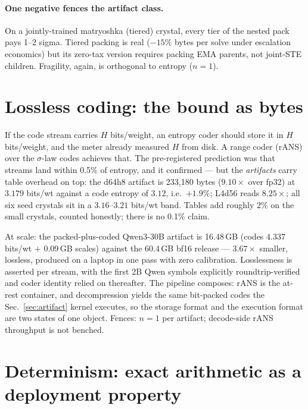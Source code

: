 \documentclass[11pt]{article}
\begin{document}
\paragraph{One negative fences the artifact class.}
On a jointly-trained matryoshka (tiered) crystal, every tier of the nested pack
pays 1--2 sigma. Tiered packing is real ($-15\%$ bytes per solve under escalation
economics) but its zero-tax version requires packing EMA parents, not joint-STE
children. Fragility, again, is orthogonal to entropy ($n{=}1$).

\section{Lossless coding: the bound as bytes}
\label{sec:rans}

If the code stream carries $H$ bits/weight, an entropy coder should store it in
$H$ bits/weight, and the meter already measured $H$ from disk. A range coder
(rANS) over the $\sigma$-law codes achieves that. The pre-registered prediction
was that streams land within 0.5\% of entropy, and it confirmed --- but the
\emph{artifacts} carry table overhead on top: the d64h8 artifact is 233{,}180
bytes ($9.10\times$ over fp32) at $3.179$ bits/wt against a code entropy of
$3.12$, i.e.\ $+1.9\%$; L4d56 reads $8.25\times$; all six seed crystals sit in a
$3.16$--$3.21$ bits/wt band. %
Tables add roughly 2\% on the small crystals, counted honestly; there is no
0.1\% claim.

At scale: the packed-plus-coded Qwen3-30B artifact is 16.48\,GB (codes $4.337$
bits/wt $+$ 0.09\,GB scales) against the 60.4\,GB bf16 release --- $3.67\times$
smaller, lossless, produced on a laptop in one pass with zero calibration.
Losslessness is asserted per stream, with the first 2B Qwen symbols explicitly
roundtrip-verified and coder identity relied on thereafter. %
The pipeline composes: rANS is the at-rest container, and decompression yields
the same bit-packed codes the Sec.~\ref{sec:artifact} kernel executes, so the
storage format and the execution format are two states of one object.
Fences: $n{=}1$ per artifact; decode-side rANS throughput is not benched.

\section{Determinism: exact arithmetic as a deployment property}
\label{sec:determinism}
\end{document}
